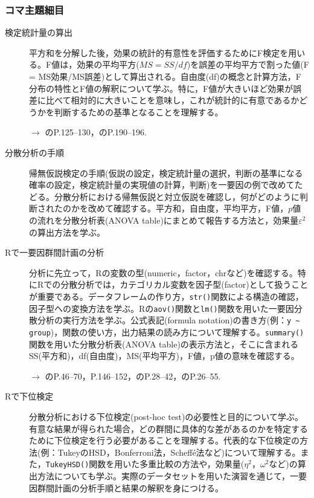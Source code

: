 \subsubsection{コマ主題細目}
\begin{description}

	\item[検定統計量の算出] 平方和を分解した後，効果の統計的有意性を評価するためにF検定を用いる。F値は，効果の平均平方($MS = SS/df$)を誤差の平均平方で割った値(F = MS効果/MS誤差)として算出される。自由度(df)の概念と計算方法，F分布の特性とF値の解釈について学ぶ。特に，F値が大きいほど効果が誤差に比べて相対的に大きいことを意味し，これが統計的に有意であるかどうかを判断するための基準となることを理解する。
	\begin{flushright}
		$\to$ \textcite{Kawabata201408}のP.125--130，\textcite{Yamada2004}のP.190--196.
	\end{flushright}

	\item[分散分析の手順] 帰無仮説検定の手順(仮説の設定，検定統計量の選択，判断の基準になる確率の設定，検定統計量の実現値の計算，判断)を一要因の例で改めてたどる。分散分析における帰無仮説と対立仮説を確認し，何がどのように判断されたのかを改めて確認する。平方和，自由度，平均平方，F値，$p$値の流れを分散分析表(ANOVA table)にまとめて報告する方法と，効果量$\varepsilon^2$の算出方法を学ぶ。

	\item[Rで一要因群間計画の分析] 分析に先立って，Rの変数の型(numeric，factor，chrなど)を確認する。特にRでの分散分析では，カテゴリカル変数を因子型(factor)として扱うことが重要である。データフレームの作り方，\verb|str()|関数による構造の確認，因子型への変換方法を学ぶ。Rの\verb|aov()|関数と\verb|lm()|関数を用いた一要因分散分析の実行方法を学ぶ。公式表記(formula notation)の書き方(例：\verb|y ~ group|)，関数の使い方，出力結果の読み方について理解する。\verb|summary()|関数を用いた分散分析表(ANOVA table)の表示方法と，そこに含まれるSS(平方和)，df(自由度)，MS(平均平方)，F値，p値の意味を確認する。
	      \begin{flushright}
		      $\to$ \textcite{kosugi2019}のP.46--70，P.146--152，\textcite{Kinosady2021}のP.28--42，\textcite{Hashimoto201607}のP.26--55.
	      \end{flushright}

	\item[Rで下位検定]
	分散分析における下位検定(post-hoc test)の必要性と目的について学ぶ。有意な結果が得られた場合，どの群間に具体的な差があるのかを特定するために下位検定を行う必要があることを理解する。代表的な下位検定の方法(例：TukeyのHSD，Bonferroni法，Scheffé法など)について理解する。また，\verb|TukeyHSD()|関数を用いた多重比較の方法や，効果量($\eta^2$，$\omega^2$など)の算出方法についても学ぶ。実際のデータセットを用いた演習を通じて，一要因群間計画の分析手順と結果の解釈を身につける。



\end{description}
